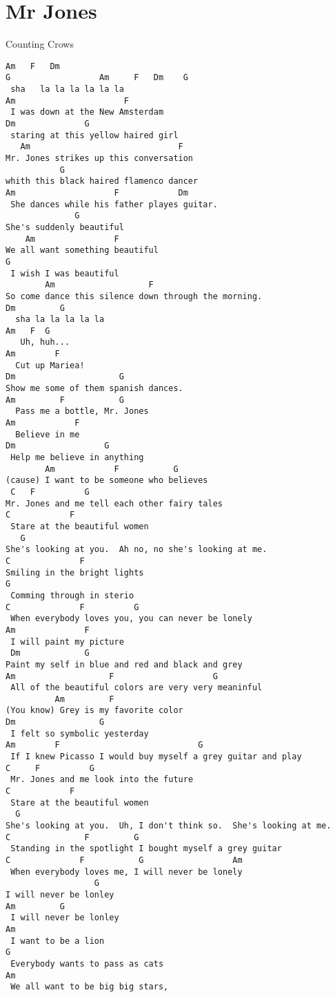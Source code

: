 \section{Mr Jones} \label{sec:song8}
Counting Crows
\begin{verbatim}
Am   F   Dm  
G                  Am     F   Dm    G 
 sha   la la la la la la 
Am                      F 
 I was down at the New Amsterdam 
Dm              G  
 staring at this yellow haired girl 
   Am                              F 
Mr. Jones strikes up this conversation 
           G   
whith this black haired flamenco dancer 
Am                    F            Dm 
 She dances while his father playes guitar. 
              G 
She's suddenly beautiful 
    Am                F 
We all want something beautiful 
G 
 I wish I was beautiful 
        Am                   F 
So come dance this silence down through the morning. 
Dm         G 
  sha la la la la la 
Am   F  G 
   Uh, huh... 
Am        F 
  Cut up Mariea! 
Dm                     G 
Show me some of them spanish dances. 
Am         F           G 
  Pass me a bottle, Mr. Jones 
Am            F 
  Believe in me 
Dm                  G 
 Help me believe in anything 
        Am            F           G 
(cause) I want to be someone who believes 
 C   F          G 
Mr. Jones and me tell each other fairy tales 
C            F 
 Stare at the beautiful women 
   G 
She's looking at you.  Ah no, no she's looking at me. 
C              F 
Smiling in the bright lights 
G 
 Comming through in sterio 
C              F          G  
 When everybody loves you, you can never be lonely 
Am              F 
 I will paint my picture 
 Dm             G 
Paint my self in blue and red and black and grey 
Am                   F                    G 
 All of the beautiful colors are very very meaninful 
          Am         F 
(You know) Grey is my favorite color 
Dm                 G 
 I felt so symbolic yesterday 
Am        F                            G 
 If I knew Picasso I would buy myself a grey guitar and play 
C     F          G 
 Mr. Jones and me look into the future 
C            F 
 Stare at the beautiful women 
  G 
She's looking at you.  Uh, I don't think so.  She's looking at me. 
C               F         G 
 Standing in the spotlight I bought myself a grey guitar 
C              F           G                  Am 
 When everybody loves me, I will never be lonely 
                  G 
I will never be lonley 
Am         G 
 I will never be lonley 
Am 
 I want to be a lion 
G 
 Everybody wants to pass as cats 
Am 
 We all want to be big big stars, 

\end{verbatim}
